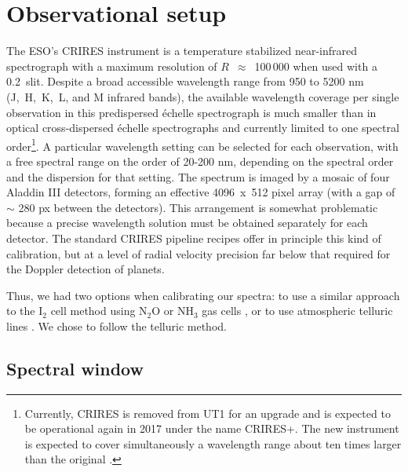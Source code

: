 \documentclass{aa}
\begin{document}
\section{Observational setup}
\label{Observational setup}

The ESO's CRIRES instrument is a temperature stabilized near-infrared spectrograph with a
maximum resolution of $R$~$\approx$~100\,000 when used with a 0.2\arcsec~slit.
Despite a broad accessible wavelength range from 950 to 5200 nm (J,~H,~K,~L, and M infrared bands),
the available wavelength coverage per single observation in this predispersed 
\'{e}chelle spectrograph is much smaller than in optical cross-dispersed 
\'{e}chelle spectrographs and currently limited to one spectral order\footnote{Currently, CRIRES is removed from UT1 for an upgrade and is expected to be operational 
again in 2017 under the name CRIRES+. The new instrument is expected to
cover simultaneously a wavelength range about ten times larger than the original \citep{Dorn2014}.}.
A particular wavelength setting can be selected for each observation, with a free spectral
range on the order of 20-200 nm, depending on the spectral order and the dispersion for that setting. 
The spectrum is imaged by a mosaic of four Aladdin III detectors, forming an effective 4096~x~512 pixel array 
(with a gap of $\sim$ 280 px between the detectors). 
This arrangement is somewhat problematic because a precise wavelength solution must be obtained separately for each detector. 
The standard CRIRES pipeline recipes offer in principle this kind of  calibration, but at a level of radial velocity precision 
far below that required for the Doppler detection of planets. 

Thus, we had two options when calibrating our spectra: to use a similar approach to 
the I$_2$ cell method  using N$_2$O or NH$_3$ gas cells \citep{Seifahrt, Bean2}, or to use atmospheric telluric lines \citep{Huelamo,Figueira}.
We chose to follow the telluric method.



\subsection{Spectral window}
\label{Spectral window}
 
\end{document}
